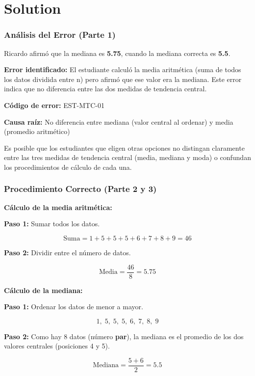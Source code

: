 \documentclass[
]{article}
\begin{document}
\section{Solution}\label{solution}

\subsubsection{Análisis del Error (Parte
1)}\label{anuxe1lisis-del-error-parte-1}

Ricardo afirmó que la mediana es \textbf{5.75}, cuando la mediana
correcta es \textbf{5.5}.

\textbf{Error identificado:} El estudiante calculó la media aritmética
(suma de todos los datos dividida entre n) pero afirmó que ese valor era
la mediana. Este error indica que no diferencia entre las dos medidas de
tendencia central.

\textbf{Código de error:} EST-MTC-01

\textbf{Causa raíz:} No diferencia entre mediana (valor central al
ordenar) y media (promedio aritmético)

Es posible que los estudiantes que eligen otras opciones no distingan
claramente entre las tres medidas de tendencia central (media, mediana y
moda) o confundan los procedimientos de cálculo de cada una.

\subsubsection{Procedimiento Correcto (Parte 2 y
3)}\label{procedimiento-correcto-parte-2-y-3}

\textbf{Cálculo de la media aritmética:}

\textbf{Paso 1:} Sumar todos los datos.

\[\text{Suma} = 1 + 5 + 5 + 5 + 6 + 7 + 8 + 9 = 46\]

\textbf{Paso 2:} Dividir entre el número de datos.

\[\text{Media} = \frac{46}{8} = 5.75\]

\textbf{Cálculo de la mediana:}

\textbf{Paso 1:} Ordenar los datos de menor a mayor.

\[1,\; 5,\; 5,\; 5,\; 6,\; 7,\; 8,\; 9\]

\textbf{Paso 2:} Como hay 8 datos (número \textbf{par}), la mediana es
el promedio de los dos valores centrales (posiciones 4 y 5).

\[\text{Mediana} = \frac{5 + 6}{2} = 5.5\]
\end{document}
